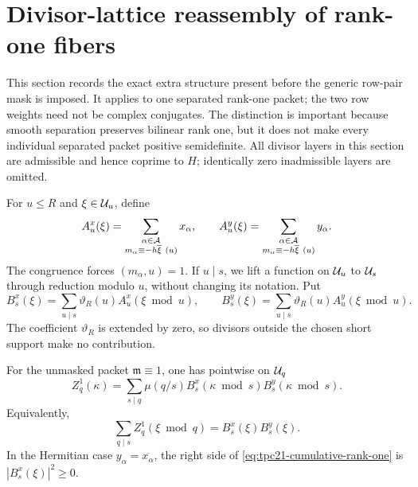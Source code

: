 \section{Divisor-lattice reassembly of rank-one fibers}
\label{sec:tpc21-divisor}

This section records the exact extra structure present before the generic
row-pair mask is imposed.  It applies to one separated rank-one packet;
the two row weights need not be complex conjugates.  The distinction is
important because smooth separation preserves bilinear rank one, but it
does not make every individual separated packet positive semidefinite.
All divisor layers in this section are admissible and hence coprime to
\(H\); identically zero inadmissible layers are omitted.

For \(u\le R\) and \(\xi\in\mathcal U_u\), define
\begin{equation}
 A_u^x(\xi)
 =\sum_{\substack{\alpha\in\mathcal A\\
        m_\alpha\equiv-h\overline\xi\ (u)}}x_\alpha,
 \qquad
 A_u^y(\xi)
 =\sum_{\substack{\alpha\in\mathcal A\\
        m_\alpha\equiv-h\overline\xi\ (u)}}y_\alpha.
 \label{eq:tpc21-one-row-fibers}
\end{equation}
The congruence forces \((m_\alpha,u)=1\).  If \(u\mid s\), we lift a
function on \(\mathcal U_u\) to \(\mathcal U_s\) through reduction modulo \(u\),
without changing its notation.  Put
\begin{equation}
 B_s^x(\xi)=\sum_{u\mid s}\vartheta_R(u)A_u^x(\xi\bmod u),
 \qquad
 B_s^y(\xi)=\sum_{u\mid s}\vartheta_R(u)A_u^y(\xi\bmod u).
 \label{eq:tpc21-divisor-prefixes}
\end{equation}
The coefficient \(\vartheta_R\) is extended by zero, so divisors outside
the chosen short support make no contribution.

\begin{theorem}
\label{thm:tpc21-lcm-mobius-reassembly}
For the unmasked packet \(\mathfrak m\equiv1\), one has pointwise on
\(\mathcal U_q\)
\begin{equation}
 \boxed{
 Z_q^{1}(\kappa)
 =\sum_{s\mid q}\mu(q/s)
 B_s^x(\kappa\bmod s)B_s^y(\kappa\bmod s).}
 \label{eq:tpc21-lcm-mobius-reassembly}
\end{equation}
Equivalently,
\begin{equation}
 \sum_{q\mid s}Z_q^{1}(\xi\bmod q)
 =B_s^x(\xi)B_s^y(\xi).
 \label{eq:tpc21-cumulative-rank-one}
\end{equation}
In the Hermitian case \(y_\alpha=\overline{x_\alpha}\), the right side
of \eqref{eq:tpc21-cumulative-rank-one} is
\(|B_s^x(\xi)|^2\ge0\).
\end{theorem}

